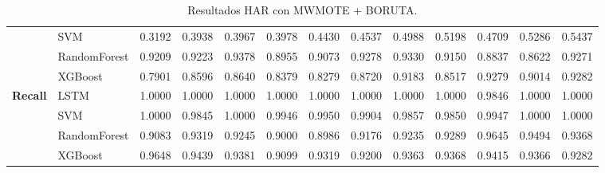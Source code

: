\begin{table}[h]
\begin{adjustbox}{max width=15cm}
\begin{tabular}{|c|l|r|r|r|r|r|r|r|r|r|r|r|}
			& SVM &  0.3192 &  0.3938 &  0.3967 &  0.3978 &  0.4430 &  0.4537 &  0.4988 &  0.5198 &  0.4709 &  0.5286 &  0.5437 \\
			& RandomForest &  0.9209 &  0.9223 &  0.9378 &  0.8955 &  0.9073 &  0.9278 &  0.9330 &  0.9150 &  0.8837 &  0.8622 &  0.9271 \\
			& XGBoost &  0.7901 &  0.8596 &  0.8640 &  0.8379 &  0.8279 &  0.8720 &  0.9183 &  0.8517 &  0.9279 &  0.9014 &  0.9282 \\
			\hline
			\textbf{Recall} & LSTM &  1.0000 &  1.0000 &  1.0000 &  1.0000 &  1.0000 &  1.0000 &  1.0000 &  1.0000 &  0.9846 &  1.0000 &  1.0000 \\
			& SVM &  1.0000 &  0.9845 &  1.0000 &  0.9946 &  0.9950 &  0.9904 &  0.9857 &  0.9850 &  0.9947 &  1.0000 &  1.0000 \\
			& RandomForest &  0.9083 &  0.9319 &  0.9245 &  0.9000 &  0.8986 &  0.9176 &  0.9235 &  0.9289 &  0.9645 &  0.9494 &  0.9368 \\
			& XGBoost &  0.9648 &  0.9439 &  0.9381 &  0.9099 &  0.9319 &  0.9200 &  0.9363 &  0.9368 &  0.9415 &  0.9366 &  0.9282 \\
			\hline
		\end{tabular}
	\end{adjustbox}
	\caption{Resultados HAR con MWMOTE + BORUTA.}
	\label{tab:HAR_MWMOTE_BORUTA}
\end{table}

